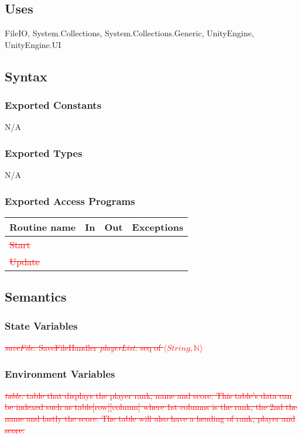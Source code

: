 \documentclass[12pt]{article}
\begin{document}
\subsection {Uses}
FileIO, System.Collections, System.Collections.Generic, UnityEngine, UnityEngine.UI

\subsection {Syntax}

\subsubsection {Exported Constants}
N/A
\subsubsection {Exported Types}
N/A
\subsubsection {Exported Access Programs}

\begin{tabular}{| l | l | l | l |}
\hline
\textbf{Routine name} & \textbf{In} & \textbf{Out} & \textbf{Exceptions}\\
\hline
\textcolor{red}{\sout{Start}}    &      &           &          \\
\hline
\textcolor{red}{\sout{Update}}   &      &           &          \\
\hline
\end{tabular}

\subsection {Semantics}

\subsubsection {State Variables}
\textcolor{red}{\sout{\textit{saveFile:} SaveFileHandler
\textit{playerList:} seq of $\langle String, \mathbb{N} \rangle$}}

\subsubsection {Environment Variables}
\textcolor{red}{\sout{\textit{table:} table that displays the player rank,  name and score. This table's data can be indexed such as table[row][column] where 1st columns is the rank, the 2nd the name and lastly the score. The table will also have a heading of rank, player and score.}}\\
\end{document}
